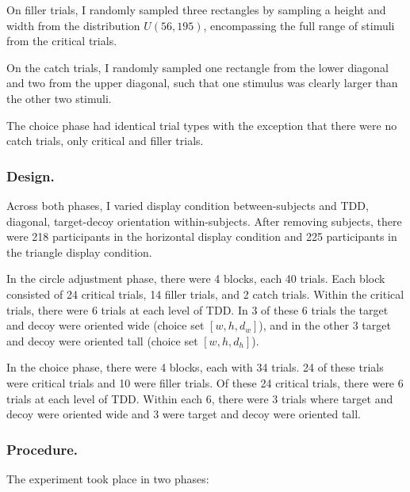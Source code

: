 On filler trials, I randomly sampled three rectangles by sampling a height and width from the distribution $U(56,195)$, encompassing the full range of stimuli from the critical trials.

On the catch trials, I randomly sampled one rectangle from the lower diagonal and two from the upper diagonal, such that one stimulus was clearly larger than the other two stimuli.

The choice phase had identical trial types with the exception that there were no catch trials, only critical and filler trials.

\subsubsection{Design.}
Across both phases, I varied display condition between-subjects and TDD, diagonal, target-decoy orientation within-subjects. After removing subjects, there were 218 participants in the horizontal display condition and 225 participants in the triangle display condition. 

In the circle adjustment phase, there were 4 blocks, each 40 trials. Each block consisted of 24 critical trials, 14 filler trials, and 2 catch trials. Within the critical trials, there were 6 trials at each level of TDD. In 3 of these 6 trials the target and decoy were oriented wide (choice set $[w,h,d_{w}]$), and in the other 3 target and decoy were oriented tall (choice set $[w,h,d_{h}]$). 

In the choice phase, there were 4 blocks, each with 34 trials. 24 of these trials were critical trials and 10 were filler trials. Of these 24 critical trials, there were 6 trials at each level of TDD. Within each 6, there were 3 trials where target and decoy were oriented wide and 3 were target and decoy were oriented tall. 

\subsubsection{Procedure.}

The experiment took place in two phases: 

